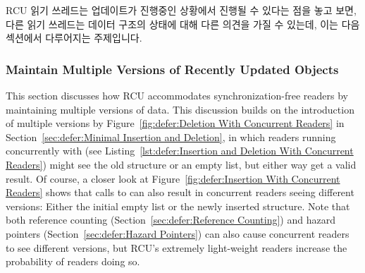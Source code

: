 RCU 읽기 쓰레드는 업데이트가 진행중인 상황에서 진행될 수 있다는 점을 놓고 보면,
다른 읽기 쓰레드는 데이터 구조의 상태에 대해 다른 의견을 가질 수 있는데, 이는
다음 섹션에서 다루어지는 주제입니다.

\subsubsection{Maintain Multiple Versions of Recently Updated Objects}
\label{sec:defer:Maintain Multiple Versions of Recently Updated Objects}

This section discusses how RCU accommodates synchronization-free readers
by maintaining multiple versions of data.
This discussion builds on the introduction of multiple versions by
Figure~\ref{fig:defer:Deletion With Concurrent Readers}
in
Section~\ref{sec:defer:Minimal Insertion and Deletion},
in which readers running concurrently with 
(see Listing~\ref{lst:defer:Insertion and Deletion With Concurrent Readers})
might see the old  structure or an empty list, but either
way get a valid result.
Of course, a closer look at
Figure~\ref{fig:defer:Insertion With Concurrent Readers}
shows that calls to  can also result in concurrent
readers seeing different versions: Either the initial empty list
or the newly inserted  structure.
Note that both reference counting
(Section~\ref{sec:defer:Reference Counting})
and hazard pointers
(Section~\ref{sec:defer:Hazard Pointers})
can also cause concurrent readers to see different versions, but
RCU's extremely light-weight readers increase the probability of
readers doing so.

